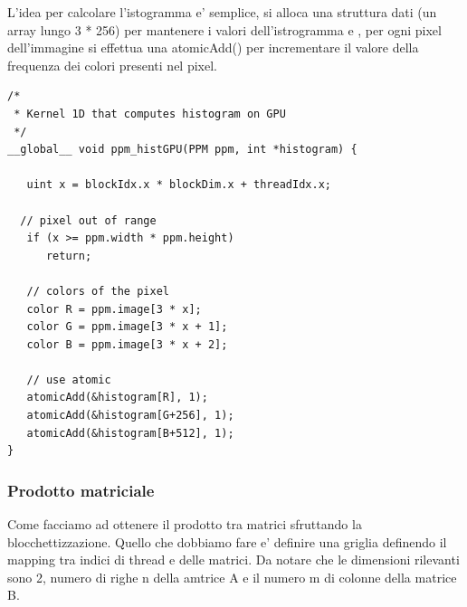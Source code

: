L'idea per calcolare l'istogramma e' semplice, si alloca una struttura dati (un array lungo 3 * 256) per mantenere i valori dell'istrogramma e , per ogni pixel dell'immagine si effettua una atomicAdd() per incrementare il valore della frequenza dei colori presenti nel pixel.

\begin{lstlisting}
/*
 * Kernel 1D that computes histogram on GPU
 */
__global__ void ppm_histGPU(PPM ppm, int *histogram) {

   uint x = blockIdx.x * blockDim.x + threadIdx.x;

  // pixel out of range
   if (x >= ppm.width * ppm.height)
      return;

   // colors of the pixel
   color R = ppm.image[3 * x];
   color G = ppm.image[3 * x + 1];
   color B = ppm.image[3 * x + 2];

   // use atomic
   atomicAdd(&histogram[R], 1);
   atomicAdd(&histogram[G+256], 1);
   atomicAdd(&histogram[B+512], 1);
}
\end{lstlisting}

\subsubsection{Prodotto matriciale}
Come facciamo ad ottenere il prodotto tra matrici sfruttando la blocchettizzazione. Quello che dobbiamo fare e' definire una griglia definendo il mapping tra indici di thread e delle matrici. Da notare che le dimensioni rilevanti sono 2, numero di righe n della amtrice A e il numero m di colonne della matrice B. 